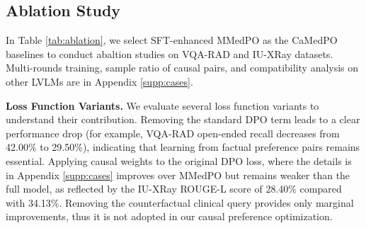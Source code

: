 \begin{table}[t]
\centering
\caption{Ablation study results on VQA-RAD and IU-XRay. “w/” and “w/o” denote with and without, respectively. $^\text{s}$ denotes the model enhanced with SFT.}
\label{tab:ablation}
\end{table}



\subsection{Ablation Study}
In Table \ref{tab:ablation}, we select SFT-enhanced MMedPO as the CaMedPO baselines to conduct abaltion studies on VQA-RAD and IU-XRay datasets. Multi-rounds training, sample ratio of causal pairs, and compatibility analysis on other LVLMs are in Appendix \ref{supp:cases}.



\noindent\textbf{Loss Function Variants.}
We evaluate several loss function variants to understand their contribution. Removing the standard DPO term leads to a clear performance drop (for example, VQA-RAD open-ended recall decreases from 42.00\% to 29.50\%), indicating that learning from factual preference pairs remains essential. Applying causal weights to the original DPO loss, where the details is in Appendix \ref{supp:cases} improves over MMedPO but remains weaker than the full model, as reflected by the IU-XRay ROUGE-L score of 28.40\% compared 
with 34.13\%. Removing the counterfactual clinical query provides only marginal improvements, thus it is not adopted in our causal preference optimization.

